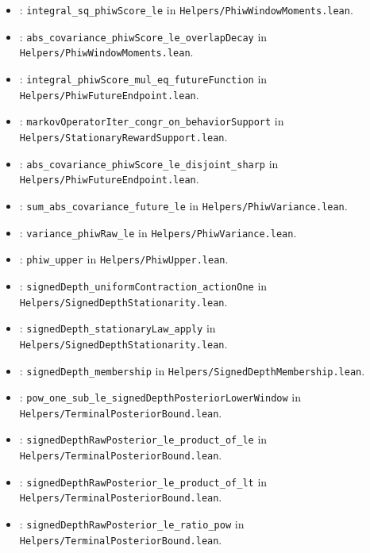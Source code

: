 \documentclass[11pt]{article}
\begin{document}
\begin{itemize}
\item {}: \texttt{integral\_sq\_phiwScore\_le} in \texttt{Helpers/PhiwWindowMoments.lean}.
\item {}: \texttt{abs\_covariance\_phiwScore\_le\_overlapDecay} in \texttt{Helpers/PhiwWindowMoments.lean}.
\item {}: \texttt{integral\_phiwScore\_mul\_eq\_futureFunction} in \texttt{Helpers/PhiwFutureEndpoint.lean}.
\item {}: \texttt{markovOperatorIter\_congr\_on\_behaviorSupport} in \texttt{Helpers/StationaryRewardSupport.lean}.
\item {}: \texttt{abs\_covariance\_phiwScore\_le\_disjoint\_sharp} in \texttt{Helpers/PhiwFutureEndpoint.lean}.
\item {}: \texttt{sum\_abs\_covariance\_future\_le} in \texttt{Helpers/PhiwVariance.lean}.
\item {}: \texttt{variance\_phiwRaw\_le} in \texttt{Helpers/PhiwVariance.lean}.
\item {}: \texttt{phiw\_upper} in \texttt{Helpers/PhiwUpper.lean}.
\item {}: \texttt{signedDepth\_uniformContraction\_actionOne} in \texttt{Helpers/SignedDepthStationarity.lean}.
\item {}: \texttt{signedDepth\_stationaryLaw\_apply} in \texttt{Helpers/SignedDepthStationarity.lean}.
\item {}: \texttt{signedDepth\_membership} in \texttt{Helpers/SignedDepthMembership.lean}.
\item {}: \texttt{pow\_one\_sub\_le\_signedDepthPosteriorLowerWindow} in \texttt{Helpers/TerminalPosteriorBound.lean}.
\item {}: \texttt{signedDepthRawPosterior\_le\_product\_of\_le} in \texttt{Helpers/TerminalPosteriorBound.lean}.
\item {}: \texttt{signedDepthRawPosterior\_le\_product\_of\_lt} in \texttt{Helpers/TerminalPosteriorBound.lean}.
\item {}: \texttt{signedDepthRawPosterior\_le\_ratio\_pow} in \texttt{Helpers/TerminalPosteriorBound.lean}.

\end{itemize}
\end{document}
